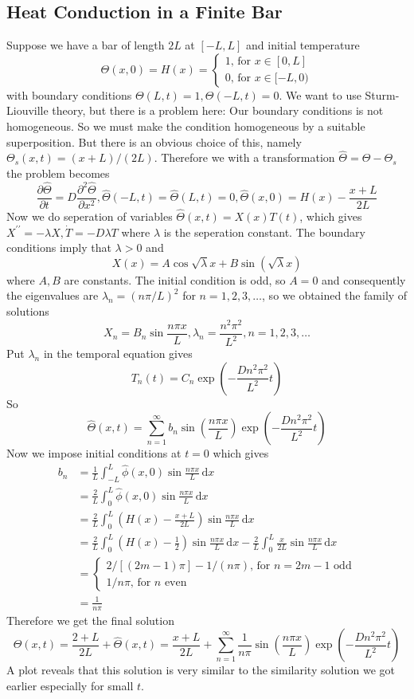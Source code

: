 \subsection{Heat Conduction in a Finite Bar}
Suppose we have a bar of length $2L$ at $[-L,L]$ and initial temperature
$$\Theta(x,0)=H(x)=\begin{cases}
    1\text{, for $x\in [0,L]$}\\
    0\text{, for $x\in [-L,0)$}
\end{cases}$$
with boundary conditions $\Theta(L,t)=1,\Theta(-L,t)=0$.
We want to use Sturm-Liouville theory, but there is a problem here:
Our boundary conditions is not homogeneous.
So we must make the condition homogeneous by a suitable superposition.
But there is an obvious choice of this, namely $\Theta_s(x,t)=(x+L)/(2L)$.
Therefore we with a transformation $\hat\Theta=\Theta-\Theta_s$ the problem becomes
$$\frac{\partial\hat\Theta}{\partial t}=D\frac{\partial^2\hat\Theta}{\partial x^2},\hat\Theta(-L,t)=\hat\Theta(L,t)=0,\hat\Theta(x,0)=H(x)-\frac{x+L}{2L}$$
Now we do seperation of variables $\hat\Theta(x,t)=X(x)T(t)$, which gives $X^{\prime\prime}=-\lambda X,\dot{T}=-D\lambda T$ where $\lambda$ is the seperation constant.
The boundary conditions imply that $\lambda>0$ and
$$X(x)=A\cos{\sqrt{\lambda}x}+B\sin(\sqrt{\lambda}x)$$
where $A,B$ are constants.
The initial condition is odd, so $A=0$ and consequently the eigenvalues are $\lambda_n=(n\pi/L)^2$ for $n=1,2,3,\ldots$, so we obtained the family of solutions
$$X_n=B_n\sin\frac{n\pi x}{L},\lambda_n=\frac{n^2\pi^2}{L^2},n=1,2,3,\ldots$$
Put $\lambda_n$ in the temporal equation gives
$$T_n(t)=C_n\exp\left( -\frac{Dn^2\pi^2}{L^2}t \right)$$
So
$$\hat\Theta(x,t)=\sum_{n=1}^\infty b_n\sin\left(\frac{n\pi x}{L}\right)\exp\left( -\frac{Dn^2\pi^2}{L^2}t \right)$$
Now we impose initial conditions at $t=0$ which gives
\begin{align*}
    b_n&=\frac{1}{L}\int_{-L}^L\hat\phi(x,0)\sin\frac{n\pi x}{L}\,\mathrm dx\\
    &=\frac{2}{L}\int_0^L\hat\phi(x,0)\sin\frac{n\pi x}{L}\,\mathrm dx\\
    &=\frac{2}{L}\int_0^L\left( H(x)-\frac{x+L}{2L} \right)\sin\frac{n\pi x}{L}\,\mathrm dx\\
    &=\frac{2}{L}\int_0^L\left( H(x)-\frac{1}{2} \right)\sin\frac{n\pi x}{L}\,\mathrm dx-\frac{2}{L}\int_0^L\frac{x}{2L}\sin\frac{n\pi x}{L}\,\mathrm dx\\
    &=\begin{cases}
        2/[(2m-1)\pi]-1/(n\pi)\text{, for $n=2m-1$ odd}\\
        1/n\pi\text{, for $n$ even}
    \end{cases}\\
    &=\frac{1}{n\pi}
\end{align*}
Therefore we get the final solution
$$\Theta(x,t)=\frac{2+L}{2L}+\hat\Theta(x,t)=\frac{x+L}{2L}+\sum_{n=1}^\infty \frac{1}{n\pi}\sin\left(\frac{n\pi x}{L}\right)\exp\left( -\frac{Dn^2\pi^2}{L^2}t \right)$$
A plot reveals that this solution is very similar to the similarity solution we got earlier especially for small $t$.
